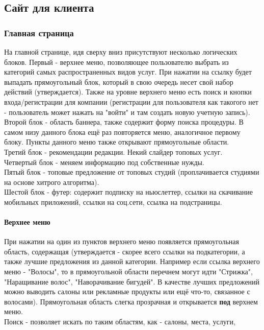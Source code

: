 \documentclass[DIV=calc, paper=a4, fontsize=11pt]{scrartcl} %
\begin{document}
\subsection{Сайт для клиента}

\subsubsection{Главная страница}

На главной странице, идя сверху вниз присутствуют несколько логических блоков. Первый - верхнее меню, позволяющее пользователю выбрать из категорий самых распространенных видов услуг. При нажатии на ссылку будет выпадать прямоугольный блок, который в свою очередь несет свой набор действий (утверждается). Также на уровне верхнего меню есть поиск и кнопки входа/регистрации для компании (регистрации для пользователя как такогого нет - пользователь может нажать на "войти" и там создать новую учетную запись).
\\Второй блок - область баннера, также содержит форму поиска процедуры. В самом низу данного блока ещё раз повторяется меню, аналогичное первому блоку. Пункты данного меню также открывают прямоугольные области.
\\Третий блок - рекомендации редакции. Некий слайдер топовых услуг.
\\Четвертый блок - меняем информацию под собственные нужды.
\\Пятый блок - топовые предложение от топовых студий (проплачивается студиями на основе хитрого алгоритма).
\\Шестой блок - футер: содержит подписку на ньюслеттер, ссылки на скачивание мобильных приложений, ссылки на соц.сети, ссылка на подстраницы.

\paragraph{Верхнее меню}
При нажатии на один из пунктов верхнего меню появляется прямоугольная область, содержащая (утверждается - скорее всего ссылки на подкатегории, а также лучшие предложения из данной категории. Например если ссылка верхнего меню - "Волосы", то в прямоугольной области перечнем могут идти "Стрижка", "Наращивание волос", "Наворачивание бигудей". В качестве лучших предложений можно выводить салоны или рекламные продукты или ещё что-то, связанное с волосами). Прямоугольная область слегка прозрачная и открывается \textbf{под} верхнем меню. 
\\[0.5cm]
Поиск - позволяет искать по таким областям, как - салоны, места, услуги, 
\end{document}
